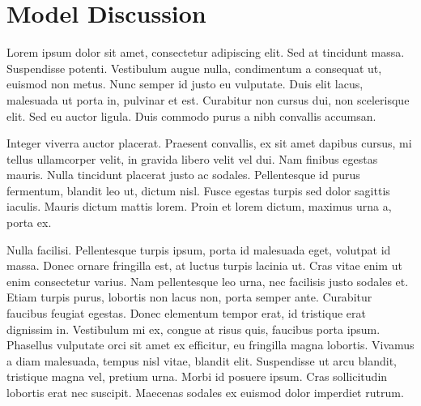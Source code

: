 \section{Model Discussion}
Lorem ipsum dolor sit amet, consectetur adipiscing elit. Sed at tincidunt massa. Suspendisse potenti. Vestibulum augue nulla, condimentum a consequat ut, euismod non metus. Nunc semper id justo eu vulputate. Duis elit lacus, malesuada ut porta in, pulvinar et est. Curabitur non cursus dui, non scelerisque elit. Sed eu auctor ligula. Duis commodo purus a nibh convallis accumsan.

Integer viverra auctor placerat. Praesent convallis, ex sit amet dapibus cursus, mi tellus ullamcorper velit, in gravida libero velit vel dui. Nam finibus egestas mauris. Nulla tincidunt placerat justo ac sodales. Pellentesque id purus fermentum, blandit leo ut, dictum nisl. Fusce egestas turpis sed dolor sagittis iaculis. Mauris dictum mattis lorem. Proin et lorem dictum, maximus urna a, porta ex.

Nulla facilisi. Pellentesque turpis ipsum, porta id malesuada eget, volutpat id massa. Donec ornare fringilla est, at luctus turpis lacinia ut. Cras vitae enim ut enim consectetur varius. Nam pellentesque leo urna, nec facilisis justo sodales et. Etiam turpis purus, lobortis non lacus non, porta semper ante. Curabitur faucibus feugiat egestas. Donec elementum tempor erat, id tristique erat dignissim in. Vestibulum mi ex, congue at risus quis, faucibus porta ipsum. Phasellus vulputate orci sit amet ex efficitur, eu fringilla magna lobortis. Vivamus a diam malesuada, tempus nisl vitae, blandit elit. Suspendisse ut arcu blandit, tristique magna vel, pretium urna. Morbi id posuere ipsum. Cras sollicitudin lobortis erat nec suscipit. Maecenas sodales ex euismod dolor imperdiet rutrum.

